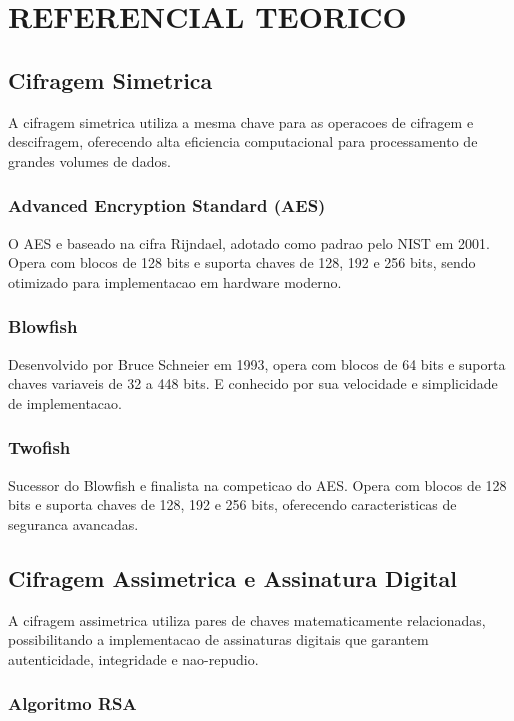 \documentclass[12pt,a4paper,oneside]{article}
\begin{document}
\section{REFERENCIAL TEORICO}

\subsection{Cifragem Simetrica}

A cifragem simetrica utiliza a mesma chave para as operacoes de cifragem e descifragem, oferecendo alta eficiencia computacional para processamento de grandes volumes de dados.

\subsubsection{Advanced Encryption Standard (AES)}

O AES e baseado na cifra Rijndael, adotado como padrao pelo NIST em 2001. Opera com blocos de 128 bits e suporta chaves de 128, 192 e 256 bits, sendo otimizado para implementacao em hardware moderno.

\subsubsection{Blowfish}

Desenvolvido por Bruce Schneier em 1993, opera com blocos de 64 bits e suporta chaves variaveis de 32 a 448 bits. E conhecido por sua velocidade e simplicidade de implementacao.

\subsubsection{Twofish}

Sucessor do Blowfish e finalista na competicao do AES. Opera com blocos de 128 bits e suporta chaves de 128, 192 e 256 bits, oferecendo caracteristicas de seguranca avancadas.

\subsection{Cifragem Assimetrica e Assinatura Digital}

A cifragem assimetrica utiliza pares de chaves matematicamente relacionadas, possibilitando a implementacao de assinaturas digitais que garantem autenticidade, integridade e nao-repudio.

\subsubsection{Algoritmo RSA}
\end{document}
